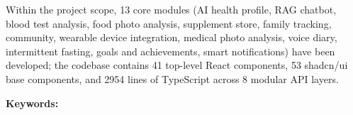 Within the project scope, 13 core modules (AI health profile, RAG chatbot, blood test analysis, food photo analysis, supplement store, family tracking, community, wearable device integration, medical photo analysis, voice diary, intermittent fasting, goals and achievements, smart notifications) have been developed; the codebase contains 41 top-level React components, 53 shadcn/ui base components, and 2954 lines of TypeScript across 8 modular API layers.

\vspace{0.5cm}
\noindent\textbf{Keywords:} \keywordsEN
